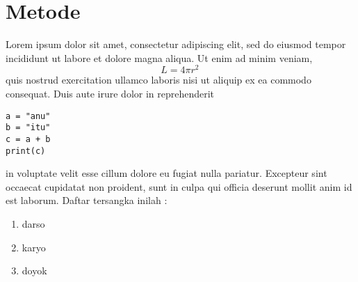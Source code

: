 \chapter{Metode}

Lorem ipsum dolor sit amet, consectetur adipiscing elit, sed do eiusmod tempor incididunt ut labore et dolore magna aliqua. Ut enim ad minim veniam, 
\begin{equation}
     L = 4 \pi r^2 \,
\end{equation}
quis nostrud exercitation ullamco laboris nisi ut aliquip ex ea commodo consequat. Duis aute irure dolor in reprehenderit 
\begin{verbatim}
a = "anu"
b = "itu"
c = a + b
print(c) 
\end{verbatim}
in voluptate velit esse cillum dolore eu fugiat nulla pariatur. Excepteur sint occaecat cupidatat non proident, sunt in culpa qui officia deserunt mollit anim id est laborum. Daftar tersangka inilah :
\begin{enumerate}
\item darso
\item karyo
\item doyok
\end{enumerate}